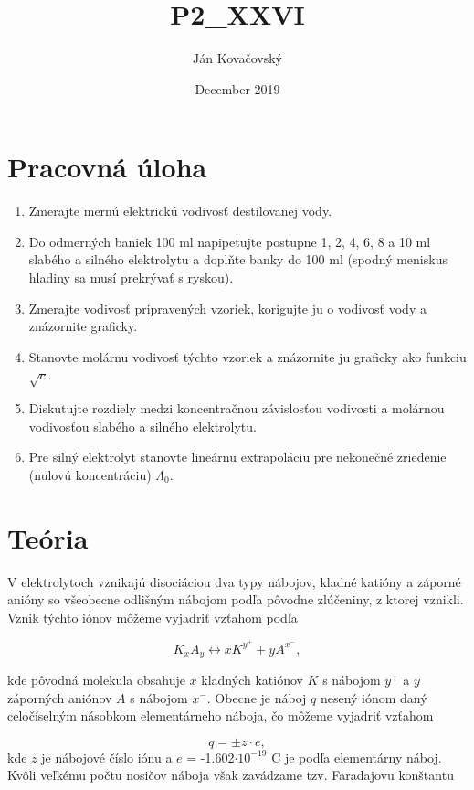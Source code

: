 \documentclass{article}
\title{P2_XXVI}
\author{Ján Kovačovský}
\date{December 2019}
\begin{document}
\renewcommand{\thefootnote}{\arabic{footnote}}



\section{Pracovná úloha}
\begin{enumerate}
    \item Zmerajte mernú elektrickú vodivosť destilovanej vody.
    \item Do odmerných baniek 100 ml napipetujte postupne 1, 2, 4, 6, 8 a 10 ml slabého a silného elektrolytu a doplňte banky do 100 ml (spodný meniskus hladiny sa musí prekrývať s ryskou).
    \item Zmerajte vodivosť pripravených vzoriek, korigujte ju o vodivosť vody a znázornite graficky.
    \item Stanovte molárnu vodivosť týchto vzoriek a znázornite ju graficky ako funkciu $\sqrt{c}$.
    \item Diskutujte rozdiely medzi koncentračnou závislosťou vodivosti a molárnou vodivosťou slabého a silného elektrolytu.
    \item Pre silný elektrolyt stanovte lineárnu extrapoláciu pre nekonečné zriedenie (nulovú koncentráciu) $\Lambda_0$.
\end{enumerate}

\section{Teória}
V elektrolytoch vznikajú disociáciou dva typy nábojov, kladné katióny a záporné anióny so všeobecne odlišným nábojom podľa pôvodne zlúčeniny, z ktorej vznikli. Vznik týchto iónov môžeme vyjadriť vzťahom podľa \cite{prak} 

\begin{equation}
    {K_x}{A_y} \leftrightarrow x{K^{y^+}} + y{A^{x^-}},
\end{equation}

kde pôvodná molekula obsahuje $x$ kladných katiónov $K$ s nábojom $y^+$ a $y$ záporných aniónov $A$ s nábojom $x^-$. Obecne je náboj $q$ nesený iónom daný celočíselným násobkom elementárneho náboja, čo môžeme vyjadriť vzťahom \cite{prak}

\begin{equation}
    q = {\pm}z{\cdot}e,
\end{equation}
kde $z$ je nábojové číslo iónu a $e$ = -1.602{$\cdot$}$10^{-19}$ C je podľa \cite{wiki} elementárny náboj. Kvôli veľkému počtu nosičov náboja však zavádzame tzv. Faradajovu konštantu \cite{prak}
\end{document}
